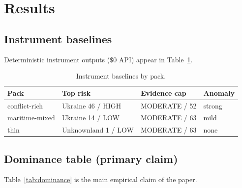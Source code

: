 \documentclass[11pt,a4paper]{article}
\begin{document}
\section{Results}

\subsection{Instrument baselines}
Deterministic instrument outputs ($\$0$ API) appear in Table~\ref{tab:baselines}.

\begin{table}[t]
\centering
\caption{Instrument baselines by pack.}
\label{tab:baselines}
\begin{tabular}{@{}llll@{}}
\toprule
\textbf{Pack} & \textbf{Top risk} & \textbf{Evidence cap} & \textbf{Anomaly} \\
\midrule
conflict-rich & Ukraine 46 / HIGH & MODERATE / 52 & strong \\
maritime-mixed & Ukraine 14 / LOW & MODERATE / 63 & mild \\
thin & Unknownland 1 / LOW & MODERATE / 63 & none \\
\bottomrule
\end{tabular}
\end{table}

\subsection{Dominance table (primary claim)}
Table~\ref{tab:dominance} is the main empirical claim of the paper.
\end{document}
